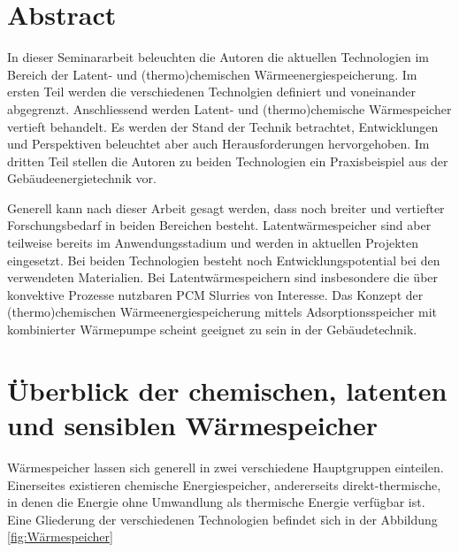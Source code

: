 \documentclass[11pt,a4paper]{scrartcl}
\begin{document}

\tableofcontents
\newpage
\renewcommand{\headrulewidth}{0.4pt}
\renewcommand{\footrulewidth}{0.4pt}
\lhead{}
\rhead{}
\cfoot{}
\setcounter{page}{1}
\cfoot{\thepage}
\section{Abstract}
In dieser Seminararbeit beleuchten die Autoren die aktuellen Technologien im
Bereich der Latent- und (thermo)chemischen Wärmeenergiespeicherung. Im ersten Teil
werden die verschiedenen Technolgien definiert und voneinander abgegrenzt.
Anschliessend werden Latent- und (thermo)chemische Wärmespeicher vertieft
behandelt. Es werden der Stand der Technik betrachtet, Entwicklungen und
Perspektiven beleuchtet aber auch Herausforderungen hervorgehoben. Im dritten
Teil stellen die Autoren zu beiden Technologien ein Praxisbeispiel aus der
Gebäudeenergietechnik vor.

Generell kann nach dieser Arbeit gesagt werden, dass noch breiter und vertiefter
Forschungsbedarf in beiden Bereichen besteht. Latentwärmespeicher sind
aber teilweise bereits im Anwendungsstadium und werden in aktuellen Projekten
eingesetzt. Bei beiden Technologien besteht noch Entwicklungspotential bei den
verwendeten Materialien.
Bei Latentwärmespeichern sind insbesondere die über konvektive Prozesse
nutzbaren PCM Slurries von Interesse.
Das Konzept der (thermo)chemischen Wärmeenergiespeicherung mittels
Adsorptionsspeicher mit kombinierter Wärmepumpe scheint geeignet zu sein in der
Gebäudetechnik.

\newpage
\section{Überblick der chemischen, latenten und sensiblen
Wärmespeicher}
Wärmespeicher lassen sich generell in zwei verschiedene Hauptgruppen einteilen.
Einerseites existieren chemische Energiespeicher, andererseits
direkt-thermische, in denen die Energie ohne Umwandlung als thermische Energie
verfügbar ist. Eine Gliederung der verschiedenen Technologien befindet sich in
der Abbildung
\ref{fig:Wärmespeicher}
\end{document}

